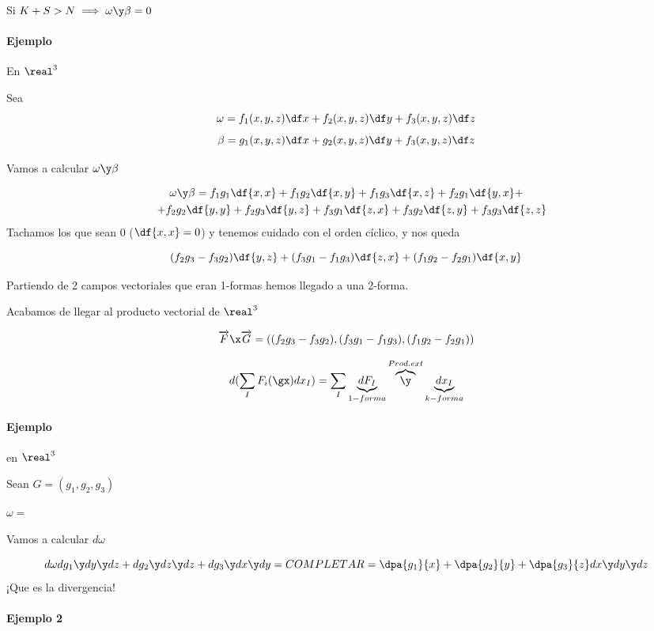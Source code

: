 \obs Si $K+S>N \implies \omega\y\beta=0$


\paragraph{Ejemplo} En $\real^3$

Sea \[\omega = f_1(x,y,z)\df x + f_2(x,y,z)\df y + f_3(x,y,z) \df z\]
\[\beta= g_1(x,y,z)\df x + g_2 (x,y,z) \df y + f_3 (x,y,z) \df z\]

Vamos a calcular $\omega\y\beta$

\begin{gather*}
\omega\y\beta  = f_1g_1\df{x,x} + f_1g_2\df{x,y} + f_1g_3\df{x,z} + f_2g_1\df{y,x} +\\  
\quad + f_2g_2\df{y,y}+ f_2g_3\df{y,z}  + f_3g_1\df{z,x}+f_3g_2\df{z,y}+f_3g_3\df{z,z}
\end{gather*}
Tachamos los que sean 0 ($\df{x,x} = 0$) y tenemos cuidado con el orden cíclico, y nos queda

\[
(f_2g_3-f_3g_2)\df{y,z} + (f_3g_1-f_1g_3)\df{z,x} + (f_1g_2 - f_2g_1) \df{x,y}
\]

Partiendo de 2 campos vectoriales que eran 1-formas hemos llegado a una 2-forma. 

\obs Acabamos de llegar al producto vectorial de $\real^3$ 

\[\overrightarrow{F}\x\overrightarrow{G} = 
\left((f_2g_3-f_3g_2),(f_3g_1-f_1g_3),(f_1g_2 - f_2g_1)\right)\]

\begin{defn}

\[d(\sum_I F_i(\gx)dx_I) = \sum_I \underbrace{dF_I}_{1-forma} \overbrace{\y}^{Prod.ext} \underbrace{dx_I}_{k-forma}\]
\end{defn}

\paragraph{Ejemplo} en $\real^3$

Sean $G = (g_1,g_2,g_3)$

$\omega = $

Vamos a calcular $d\omega$

\[d\omega dg_1\y dy\y dz + dg_2 \y dz\y dz + dg_3 \y dx \y dy = COMPLETAR = \dpa{g_1}{x} + \dpa{g_2}{y}+\dpa{g_3}{z}dx\y dy\y dz\] ¡Que es la divergencia!

\paragraph{Ejemplo 2}

